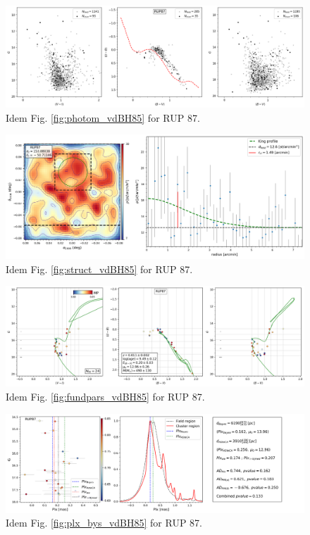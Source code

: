 \documentclass[draft]{aa}
\begin{document}
\begin{figure}[ht]
    \centering
    \includegraphics[width=\hsize]{../figs/obs_RUP87.png}
    \caption{Idem Fig. \ref{fig:photom_vdBH85} for RUP 87.}
    \label{fig:photom_RUP87}
\end{figure}
\begin{figure}[ht]
    \centering
    \includegraphics[width=\hsize]{../figs/dmap_rup87.png}
    \caption{Idem Fig. \ref{fig:struct_vdBH85} for RUP 87.}
    \label{fig:struct_RUP87}
\end{figure}
\begin{figure}[ht]
    \centering
    \includegraphics[width=\hsize]{../figs/cmds_rup87.png}
    \caption{Idem Fig. \ref{fig:fundpars_vdBH85} for RUP 87.}
    \label{fig:fundpars_RUP87}
\end{figure}
\begin{figure}[ht]
    \centering
    \includegraphics[width=\hsize]{../figs/plx_RUP87.png}
    \caption{Idem Fig. \ref{fig:plx_bys_vdBH85} for RUP 87.}
    \label{fig:plx_bys_RUP87}
\end{figure}
\end{document}
